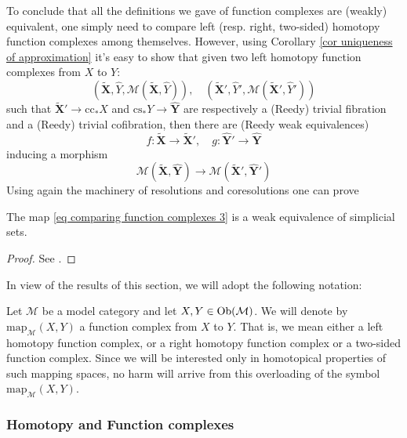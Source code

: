 To conclude that all the definitions we gave of function complexes are (weakly) equivalent, one simply need to compare left (resp. right, two-sided) homotopy function complexes among themselves. However, using Corollary \ref{cor uniqueness of approximation} it's easy to show that given two left homotopy function complexes from $X$ to $Y$:
\[
\left( \widetilde{\mathbf X}, \widehat{Y}, \mathcal M(\widetilde{\mathbf X}, \widehat{Y}) \right), \quad \left( \widetilde{\mathbf X}', \widehat{Y}', \mathcal M(\widetilde{\mathbf X}', \widehat{Y}') \right)
\]
such that $\widetilde{\mathbf X}' \to \mathrm{cc}_* X$ and $\mathrm{cs}_* Y \to \widehat{\mathbf Y}$ are respectively a (Reedy) trivial fibration and a (Reedy) trivial cofibration, then there are (Reedy weak equivalences)
\[
f \colon \widetilde{\mathbf X} \to \widetilde{\mathbf X}', \quad g \colon \widehat{\mathbf Y}' \to \widehat{\mathbf Y}
\]
inducing a morphism
\begin{equation} \label{eq comparing function complexes 3}
\mathcal M(\widetilde{\mathbf X}, \widehat{\mathbf Y}) \to \mathcal M( \widetilde{\mathbf X}', \widehat{\mathbf Y}')
\end{equation}
Using again the machinery of resolutions and coresolutions one can prove

\begin{thm}
The map \eqref{eq comparing function complexes 3} is a weak equivalence of simplicial sets.
\end{thm}

\begin{proof}
See \cite[Proposition 17.1.10]{hirschhorn}.
\end{proof}

In view of the results of this section, we will adopt the following notation:

\begin{notation}
Let $\mathcal M$ be a model category and let $X,Y \in \mathrm{Ob}(\mathcal M)$. We will denote by $\mathrm{map}_{\mathcal M}(X,Y)$ a function complex from $X$ to $Y$. That is, we mean either a left homotopy function complex, or a right homotopy function complex or a two-sided function complex. Since we will be interested only in homotopical properties of such mapping spaces, no harm will arrive from this overloading of the symbol $\mathrm{map}_{\mathcal M}(X,Y)$.
\end{notation}

\subsubsection*{Homotopy and Function complexes}

